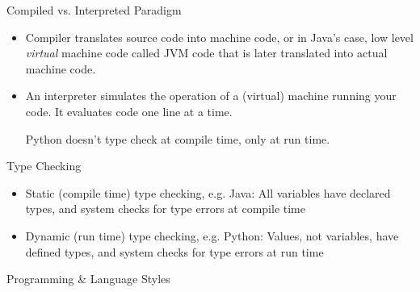 \documentclass[12pt]{article}
\theoremstyle{plain}
\theoremstyle{definition}
\theoremstyle{remark}
\begin{document}
Compiled vs. Interpreted Paradigm
\begin{itemize}
  \item Compiler translates source code into machine code, or
    in Java's case, low level \emph{virtual} machine code called JVM
    code that is later translated into actual machine code.
  \item An interpreter simulates the operation of a (virtual) machine
    running your code.
    It evaluates code one line at a time.

    Python doesn't type check at compile time, only at run time.
\end{itemize}
Type Checking
\begin{itemize}
  \item Static (compile time) type checking, e.g. Java:
    All variables have declared types, and system checks for type
    errors at compile time
  \item Dynamic (run time) type checking, e.g. Python:
    Values, not variables, have defined types, and system checks for
    type errors at run time
\end{itemize}
Programming \& Language Styles
\end{document}
